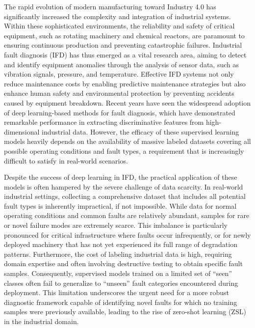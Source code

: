 \documentclass[journal,12pt,onecolumn]{IEEEtran}
\begin{document}
The rapid evolution of modern manufacturing toward Industry 4.0 has significantly increased the complexity and integration of industrial systems. Within these sophisticated environments, the reliability and safety of critical equipment, such as rotating machinery and chemical reactors, are paramount to ensuring continuous production and preventing catastrophic failures. Industrial fault diagnosis (IFD) has thus emerged as a vital research area, aiming to detect and identify equipment anomalies through the analysis of sensor data, such as vibration signals, pressure, and temperature. Effective IFD systems not only reduce maintenance costs by enabling predictive maintenance strategies but also enhance human safety and environmental protection by preventing accidents caused by equipment breakdown. Recent years have seen the widespread adoption of deep learning-based methods for fault diagnosis, which have demonstrated remarkable performance in extracting discriminative features from high-dimensional industrial data. However, the efficacy of these supervised learning models heavily depends on the availability of massive labeled datasets covering all possible operating conditions and fault types, a requirement that is increasingly difficult to satisfy in real-world scenarios.

Despite the success of deep learning in IFD, the practical application of these models is often hampered by the severe challenge of data scarcity. In real-world industrial settings, collecting a comprehensive dataset that includes all potential fault types is inherently impractical, if not impossible. While data for normal operating conditions and common faults are relatively abundant, samples for rare or novel failure modes are extremely scarce. This imbalance is particularly pronounced for critical infrastructure where faults occur infrequently, or for newly deployed machinery that has not yet experienced its full range of degradation patterns. Furthermore, the cost of labeling industrial data is high, requiring domain expertise and often involving destructive testing to obtain specific fault samples. Consequently, supervised models trained on a limited set of ``seen'' classes often fail to generalize to ``unseen'' fault categories encountered during deployment. This limitation underscores the urgent need for a more robust diagnostic framework capable of identifying novel faults for which no training samples were previously available, leading to the rise of zero-shot learning (ZSL) in the industrial domain.
\end{document}

